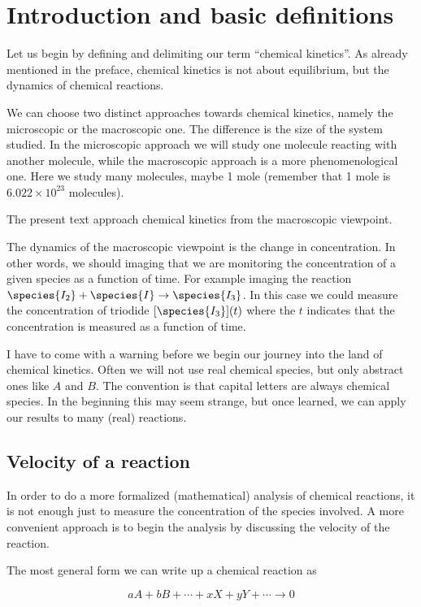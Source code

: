 \chapter{Introduction and basic definitions}
\label{chap:intro}

Let us begin by defining and delimiting our term ``chemical
kinetics''. As already mentioned in the preface, chemical kinetics is
not about equilibrium, but the dynamics of chemical reactions.

We can choose two distinct approaches towards chemical kinetics, namely
the microscopic or the macroscopic one. The difference is the size of
the system studied. In the microscopic approach we will study one
molecule reacting with another molecule, while the macroscopic
approach is a more phenomenological one. Here we study many molecules,
maybe 1 mole (remember that 1 mole is $6.022\times 10^{23}$
molecules).

The present text approach chemical kinetics from the macroscopic
viewpoint.

The dynamics of the macroscopic viewpoint is the change in
concentration. In other words, we should imaging that we are
monitoring the concentration of a given species as a function of
time. For example imaging the reaction $\species{I_2} + \species{I} \rightarrow \species{I_3}$. In this
case we could measure the concentration of triodide \ie
$[\species{I_3}](t)$ where the $t$ indicates that the concentration is
measured as a function of time.

I have to come with a warning before we begin our journey into the
land of chemical kinetics. Often we will not use real chemical
species, but only abstract ones like $A$ and $B$. The convention is
that capital letters are always chemical species. In the beginning this
may seem strange, but once learned, we can apply our results to many
(real) reactions.

\section{Velocity of a reaction}

In order to do a more formalized (\ie mathematical) analysis of
chemical reactions, it is not enough just to measure the concentration
of the species involved. A more convenient approach is to begin the
analysis by discussing the velocity of the reaction.

The most general form we can write up a chemical reaction as

\[
  aA + bB + \cdots + xX + yY + \cdots \rightarrow 0
\]

